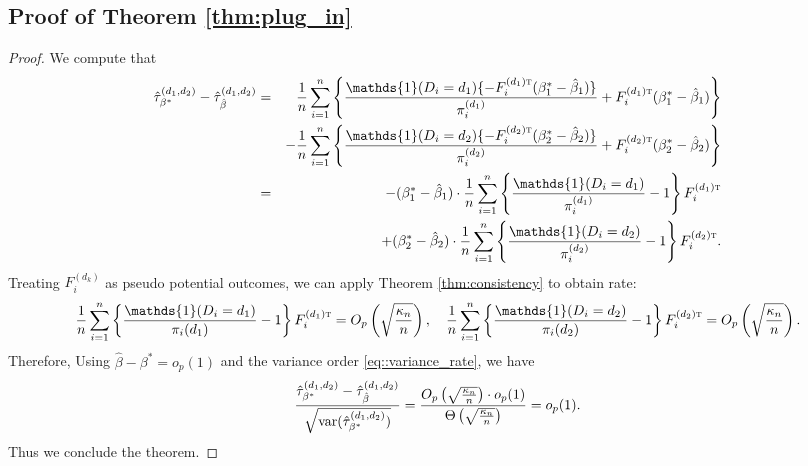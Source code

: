 \documentclass[twoside,letterpaper]{article}
\newcommand{\mathbbm}[1]{\mathds{#1}}
\theoremstyle{plain}
\theoremstyle{definition}
\theoremstyle{remark}
\def\T{{\textsc{t}}}
\newcommand{\var}{\textup{var}}
\newcommand{\indicator}{\mathbbm{1}}
\newcommand{\sumi}{\sum_{i=1}^n}
\begin{document}
\subsection{Proof of Theorem \ref{thm:plug_in}}
\begin{proof}
    We compute that
    \begin{eqnarray*}
        \hat\tau^{(d_1, d_2)}_{\beta^*} - \hat\tau^{(d_1, d_2)}_{\hat\beta} &=& \frac{1}{n}\sumi \left\{ \frac{\indicator(D_i=d_1)\{-F_i^{(d_1)\T} (\beta_1^* - \hat\beta_1)\}}{\pi_i^{(d_1)}} + F_i^{(d_1)\T}(\beta_1^* - \hat\beta_1) \right\} \\
        &&- \frac{1}{n}\sumi \left\{ \frac{\indicator(D_i=d_2)\{-F_i^{(d_2)\T} (\beta_2^* - \hat\beta_2)\}}{\pi_i^{(d_2)}} + F_i^{(d_2)\T}(\beta_2^* - \hat\beta_2) \right\} \\
        &=& -(\beta_1^* - \hat\beta_1)\cdot \frac{1}{n}\sumi  \left\{\frac{\indicator(D_i=d_1)}{\pi_i^{(d_1)}} - 1\right\}F_i^{(d_1)\T} \\
        &&+ (\beta_2^* - \hat\beta_2)\cdot \frac{1}{n}\sumi \left\{\frac{\indicator(D_i=d_2)}{\pi_i^{(d_2)}} - 1\right\}F_i^{(d_2)\T}.
    \end{eqnarray*}
    Treating $F_i^{(d_k)}$ as pseudo potential outcomes, we can apply Theorem \ref{thm:consistency} to obtain rate:
    \begin{eqnarray*}
        \frac{1}{n}\sumi  \left\{\frac{\indicator(D_i=d_1)}{\pi_i(d_1)} - 1\right\}F_i^{(d_1)\T} = O_p\left(\sqrt{\frac{\kappa_n}{n}}\right), \quad \frac{1}{n}\sumi \left\{\frac{\indicator(D_i=d_2)}{\pi_i(d_2)} - 1\right\}F_i^{(d_2)\T} = O_p\left(\sqrt{\frac{\kappa_n}{n}}\right).
    \end{eqnarray*}
    Therefore,  Using $\hat\beta - \beta^* = o_p(1)$ and the variance order \eqref{eq::variance_rate}, we have
    \begin{eqnarray*}
        \frac{\hat\tau^{(d_1, d_2)}_{\beta^*} - \hat\tau^{(d_1, d_2)}_{\hat\beta}}{\sqrt{\var(\hat\tau^{(d_1, d_2)}_{\beta^*})}} = \frac{O_p\left(\sqrt{\frac{\kappa_n}{n}}\right) \cdot o_p(1)}{\Theta\left(\sqrt{\frac{\kappa_n}{n}}\right)}  = o_p(1).
    \end{eqnarray*}
    Thus we conclude the theorem.
\end{proof}
\end{document}
